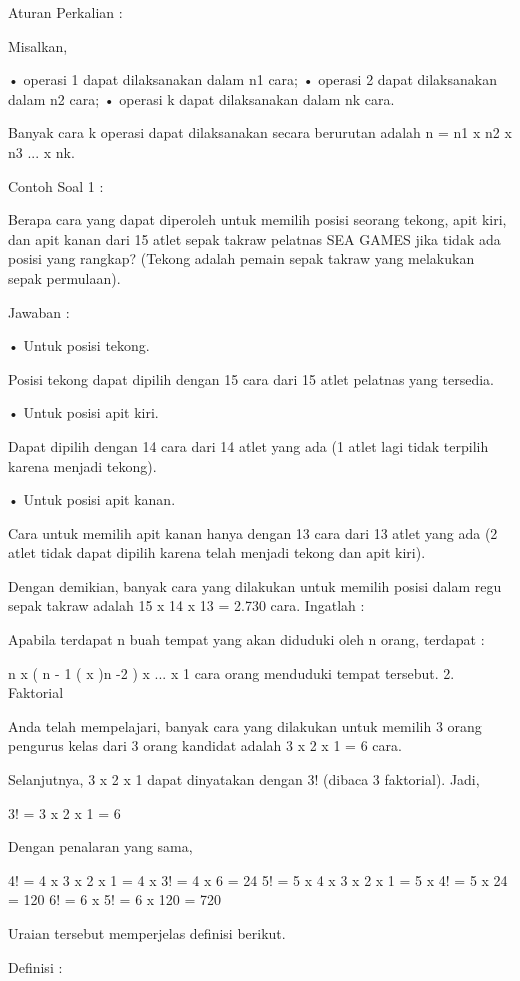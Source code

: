 \documentclass[11pt,fleqn]{book} %
\begin{document}
Aturan Perkalian :

Misalkan,

• operasi 1 dapat dilaksanakan dalam n1 cara;
• operasi 2 dapat dilaksanakan dalam n2 cara;
• operasi k dapat dilaksanakan dalam nk cara.

Banyak cara k operasi dapat dilaksanakan secara berurutan adalah n = n1 x n2 x n3 ... x nk.

Contoh Soal 1 :

Berapa cara yang dapat diperoleh untuk memilih posisi seorang tekong, apit kiri, dan apit kanan dari 15 atlet sepak takraw pelatnas SEA GAMES jika tidak ada posisi yang rangkap? (Tekong adalah pemain sepak takraw yang melakukan sepak permulaan).

Jawaban :

• Untuk posisi tekong.

Posisi tekong dapat dipilih dengan 15 cara dari 15 atlet pelatnas yang tersedia.

• Untuk posisi apit kiri.

Dapat dipilih dengan 14 cara dari 14 atlet yang ada (1 atlet lagi tidak terpilih karena menjadi tekong).

• Untuk posisi apit kanan.

Cara untuk memilih apit kanan hanya dengan 13 cara dari 13 atlet yang ada (2 atlet tidak dapat dipilih karena telah menjadi tekong dan apit kiri).

Dengan demikian, banyak cara yang dilakukan untuk memilih posisi dalam regu sepak takraw adalah  15 x 14 x 13 = 2.730 cara.
Ingatlah :

Apabila terdapat n buah tempat yang akan diduduki oleh n orang, terdapat :

n x ( n - 1 ( x )n -2 ) x ... x 1 cara orang menduduki tempat tersebut.
2. Faktorial

Anda telah mempelajari, banyak cara yang dilakukan untuk memilih 3 orang pengurus kelas dari 3 orang kandidat adalah 3 x 2 x 1 = 6 cara.

Selanjutnya, 3 x 2 x 1 dapat dinyatakan dengan 3! (dibaca 3 faktorial). Jadi,

3! = 3 x 2 x 1 = 6

Dengan penalaran yang sama,

4! = 4 x 3 x 2 x 1 = 4 x 3! = 4 x 6 = 24
5! = 5 x 4 x 3 x 2 x 1 = 5 x 4! = 5 x 24 = 120
6! = 6 x 5! = 6 x 120 = 720

Uraian tersebut memperjelas definisi berikut.

Definisi :
\end{document}
